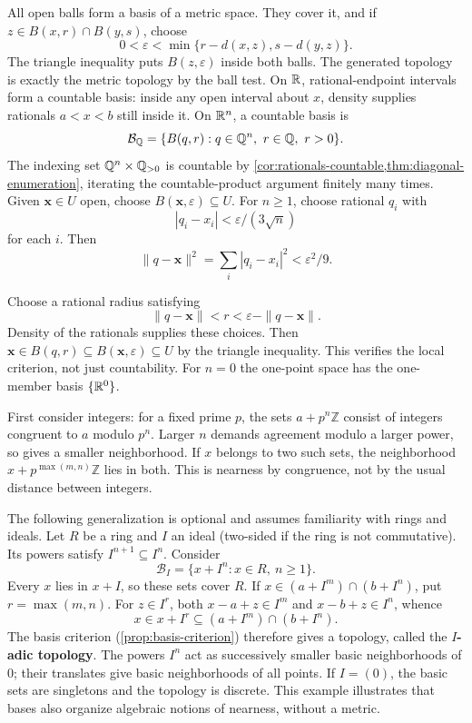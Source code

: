 \begin{example}\label{ex:rational-basis}
All open balls form a basis of a metric space. They cover it, and if
$z\in B(x,r)\cap B(y,s)$, choose
\[
0<\varepsilon<\min\{r-d(x,z),s-d(y,z)\}.
\]
The triangle inequality puts $B(z,\varepsilon)$ inside both balls.
The generated topology is exactly the metric topology by the ball test.
On $\mathbb{R}$, rational-endpoint intervals form a countable basis: inside any
open interval about $x$, density supplies rationals $a<x<b$ still inside it.
On $\mathbb{R}^n$, a countable basis is
\[
\mathcal B_{\mathbb{Q}}=\{B(q,r):q\in\mathbb{Q}^n,\ r\in\mathbb{Q},\ r>0\}.
\]
The indexing set $\mathbb{Q}^n\times\mathbb{Q}_{>0}$ is countable by
\cref{cor:rationals-countable,thm:diagonal-enumeration}, iterating the
countable-product argument finitely many times. Given $\mathbf{x}\in U$ open,
choose $B(\mathbf{x},\varepsilon)\subseteq U$. For $n\geq1$, choose rational
$q_i$ with
\[
|q_i-x_i|<\varepsilon/(3\sqrt n)
\]
 for each $i$.
Then
\[
\|q-\mathbf{x}\|^2=\sum_i|q_i-x_i|^2<\varepsilon^2/9.
\]

Choose a rational radius satisfying
\[
\|q-\mathbf{x}\|<r<\varepsilon-\|q-\mathbf{x}\|.
\]
Density of the rationals supplies these choices.
Then $\mathbf{x}\in B(q,r)\subseteq B(\mathbf{x},\varepsilon)\subseteq U$ by the triangle
inequality. This verifies the local criterion, not just countability.
For $n=0$ the one-point space has the one-member basis $\{\mathbb{R}^0\}$.
\end{example}

\begin{example}\label{ex:iadic-basis}
First consider integers: for a fixed prime $p$, the sets
$a+p^n\mathbb Z$ consist of integers congruent to $a$ modulo $p^n$.
Larger $n$ demands agreement modulo a larger power, so gives a smaller
neighborhood. If $x$ belongs to two such sets, the neighborhood
$x+p^{\max(m,n)}\mathbb Z$ lies in both. This is nearness by congruence,
not by the usual distance between integers.

The following generalization is optional and assumes familiarity with
rings and ideals. Let $R$ be a ring and $I$ an ideal (two-sided if the ring is not
commutative). Its powers satisfy $I^{n+1}\subseteq I^n$. Consider
\[
\mathcal B_I=\{x+I^n:x\in R,\ n\geq1\}.
\]
Every $x$ lies in $x+I$, so these sets cover $R$. If
$x\in(a+I^m)\cap(b+I^n)$, put $r=\max(m,n)$. For $z\in I^r$,
both $x-a+z\in I^m$ and $x-b+z\in I^n$, whence
\[
x\in x+I^r\subseteq(a+I^m)\cap(b+I^n).
\]
The basis criterion (\cref{prop:basis-criterion}) therefore gives a
topology, called the \textbf{$I$-adic topology}. The powers $I^n$ act as
successively smaller basic neighborhoods of $0$; their translates give
basic neighborhoods of all points. If $I=(0)$, the basic sets are
singletons and the topology is discrete. This example illustrates that
bases also organize algebraic notions of nearness, without a metric.
\end{example}

